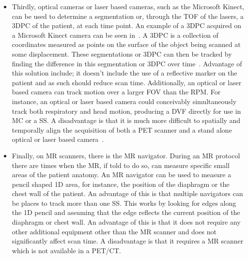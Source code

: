 \begin{itemize}
                    \item Thirdly, optical cameras or laser based cameras, such as the Microsoft Kinect, can be used to determine a segmentation or, through the \gls{TOF} of the lasers, a \gls{3DPC} of the patient, at each time point. An example of a \gls{3DPC} acquired on a Microsoft Kinect camera can be seen in~. A \gls{3DPC} is a collection of coordinates measured as points on the surface of the object being scanned at some displacement. These segmentations or \gls{3DPC} can then be tracked by finding the difference in this segmentation or \gls{3DPC} over time~. Advantage of this solution include;  it doesn't include the use of a reflective marker on the patient and as such should reduce scan time. Additionally, an optical or laser based camera can track motion over a larger \gls{FOV} than the \gls{RPM}. For instance, an optical or laser based camera could conceivably simultaneously track both respiratory and head motion, producing a \gls{DVF} directly for use in \gls{MC} or a \gls{SS}. A disadvantage is that it is much more difficult to spatially and temporally align the acquisition of both a \gls{PET} scanner and a stand alone optical or laser based camera~.
                    
                    \item Finally, on \gls{MR} scanners, there is the \gls{MR} navigator. During an \gls{MR} protocol there are times when the \gls{MR}, if told to do so, can measure specific small areas of the patient anatomy. An \gls{MR} navigator can be used to measure a pencil shaped \gls{1D} area, for instance, the position of the diaphragm or the chest wall of the patient. An advantage of this is that multiple navigators can be places to track more than one \gls{SS}. This works by looking for edges along the \gls{1D} pencil and assuming that the edge reflects the current position of the diaphragm or chest wall. An advantage of this is that it does not require any other additional equipment other than the \gls{MR} scanner and does not significantly affect scan time. A disadvantage is that it requires a \gls{MR} scanner which is not available in a \gls{PET}/\gls{CT}.
                \end{itemize}
                
